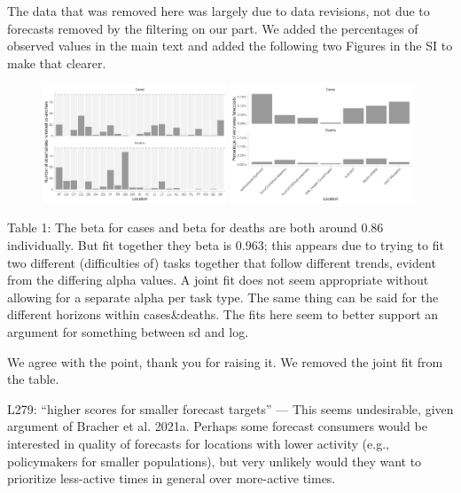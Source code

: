 \documentclass{article}
\newcommand{\black}{\color{black}}
\newcommand{\blue}{\color{blue}}
\begin{document}
\black
The data that was removed here was largely due to data revisions, not due to forecasts removed by the filtering on our part. 
We added the percentages of observed values in the main text and added the following two Figures in the SI to make that clearer. 

\begin{figure}[h!]
    \centering
    \includegraphics[width=0.49\textwidth]{output/figures/number-anomalies.png}
     \includegraphics[width=0.49\textwidth]{output/figures/erroneous-forecasts.png}
     \caption{}
    \label{fig:number-anomalies}
\end{figure}


\blue
Table 1: The beta for cases and beta for deaths are both around 0.86 individually. But fit together they beta is 0.963; this appears due to trying to fit two different (difficulties of) tasks together that follow different trends, evident from the differing alpha values. A joint fit does not seem appropriate without allowing for a separate alpha per task type. The same thing can be said for the different horizons within cases\&deaths. The fits here seem to better support an argument for something between sd and log.

\black
We agree with the point, thank you for raising it. We removed the joint fit from the table. 

\blue
L279: “higher scores for smaller forecast targets” — This seems undesirable, given argument of Bracher et al. 2021a. Perhaps some forecast consumers would be interested in quality of forecasts for locations with lower activity (e.g., policymakers for smaller populations), but very unlikely would they want to prioritize less-active times in general over more-active times.  
\end{document}
